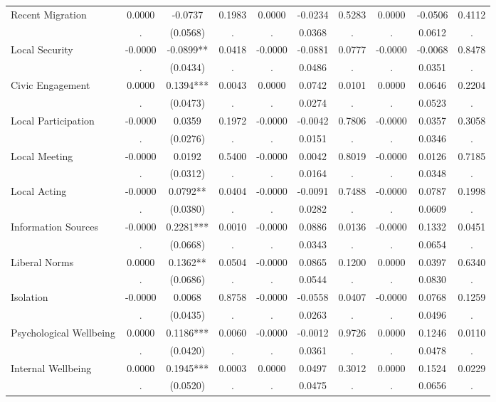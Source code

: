 \begin{tabular}{l*{9}{c}}
Recent Migration & 0.0000 & -0.0737 & 0.1983 & 0.0000 & -0.0234 & 0.5283 & 0.0000 & -0.0506 & 0.4112 \\
  & . & (0.0568) & . & . & 0.0368 & . & . & 0.0612 & . \\
Local Security & -0.0000 & -0.0899** & 0.0418 & -0.0000 & -0.0881 & 0.0777 & -0.0000 & -0.0068 & 0.8478 \\
  & . & (0.0434) & . & . & 0.0486 & . & . & 0.0351 & . \\
Civic Engagement & 0.0000 & 0.1394*** & 0.0043 & 0.0000 & 0.0742 & 0.0101 & 0.0000 & 0.0646 & 0.2204 \\
  & . & (0.0473) & . & . & 0.0274 & . & . & 0.0523 & . \\
Local Participation & -0.0000 & 0.0359 & 0.1972 & -0.0000 & -0.0042 & 0.7806 & -0.0000 & 0.0357 & 0.3058 \\
  & . & (0.0276) & . & . & 0.0151 & . & . & 0.0346 & . \\
Local Meeting & -0.0000 & 0.0192 & 0.5400 & -0.0000 & 0.0042 & 0.8019 & -0.0000 & 0.0126 & 0.7185 \\
  & . & (0.0312) & . & . & 0.0164 & . & . & 0.0348 & . \\
Local Acting & -0.0000 & 0.0792** & 0.0404 & -0.0000 & -0.0091 & 0.7488 & -0.0000 & 0.0787 & 0.1998 \\
  & . & (0.0380) & . & . & 0.0282 & . & . & 0.0609 & . \\
Information Sources & -0.0000 & 0.2281*** & 0.0010 & -0.0000 & 0.0886 & 0.0136 & -0.0000 & 0.1332 & 0.0451 \\
  & . & (0.0668) & . & . & 0.0343 & . & . & 0.0654 & . \\
Liberal Norms & 0.0000 & 0.1362** & 0.0504 & -0.0000 & 0.0865 & 0.1200 & 0.0000 & 0.0397 & 0.6340 \\
  & . & (0.0686) & . & . & 0.0544 & . & . & 0.0830 & . \\
Isolation & -0.0000 & 0.0068 & 0.8758 & -0.0000 & -0.0558 & 0.0407 & -0.0000 & 0.0768 & 0.1259 \\
  & . & (0.0435) & . & . & 0.0263 & . & . & 0.0496 & . \\
Psychological Wellbeing & 0.0000 & 0.1186*** & 0.0060 & -0.0000 & -0.0012 & 0.9726 & 0.0000 & 0.1246 & 0.0110 \\
  & . & (0.0420) & . & . & 0.0361 & . & . & 0.0478 & . \\
Internal Wellbeing & 0.0000 & 0.1945*** & 0.0003 & 0.0000 & 0.0497 & 0.3012 & 0.0000 & 0.1524 & 0.0229 \\
  & . & (0.0520) & . & . & 0.0475 & . & . & 0.0656 & . \\

\end{tabular}
